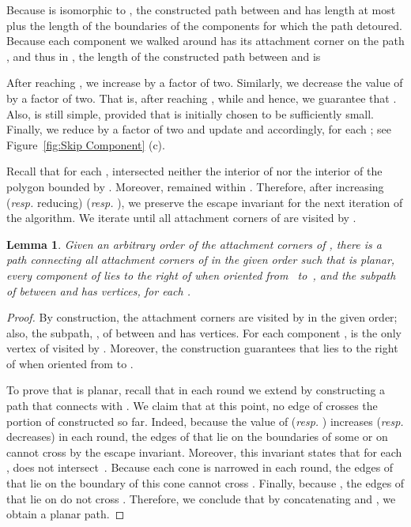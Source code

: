 \documentclass[11pt]{patmorin}
\newtheorem{lemma}[theorem]{Lemma}
\begin{document}
Because  is isomorphic to , the constructed path between  and  has length at most  plus the length of the boundaries of the components for which the path detoured. Because each component we walked around has its attachment corner on the path , and thus in , the length of the constructed path between  and  is


After reaching , we increase  by a factor of two. Similarly, we decrease the value of  by a factor of two. That is, after reaching ,  while  and hence, we guarantee that .
Also,  is still simple, provided that  is initially chosen to be sufficiently small.
Finally, we reduce  by a factor of two and update  and  accordingly, for each ; see Figure~\ref{fig:Skip Component} (c).

Recall that for each ,  intersected neither the interior of  nor the interior of the polygon bounded by . Moreover,  remained within .
Therefore, after increasing (\emph{resp.} reducing)  (\emph{resp.} ), we preserve the escape invariant for the next iteration of the algorithm.
We iterate until all attachment corners of  are visited by .

\begin{lemma}\label{lemma:Path for connected augmentations}
Given an arbitrary order  of the attachment corners of , there is a path  connecting all attachment corners of  in the given order such that  is planar, every component  of  lies to the right of  when oriented from ~to~, and the subpath of  between  and  has  vertices, for each .
\end{lemma}
\begin{proof}
By construction, the attachment corners are visited by  in the given order; also, the subpath, , of  between  and  has  vertices. For each component ,  is the only vertex of  visited by . Moreover, the construction guarantees that  lies to the right of  when oriented from  to .

To prove that  is planar, recall that in each round we extend  by constructing  a path  that connects  with . We claim that at this point, no edge of  crosses the portion of  constructed so far.
Indeed, because the value of  (\emph{resp.} ) increases (\emph{resp.} decreases) in each round, the edges of  that lie on the boundaries of some  or on  cannot cross  by the escape invariant.
Moreover, this invariant states that for each ,  does not intersect~.
Because each cone  is narrowed in each round, the edges of  that lie on the boundary of this cone cannot cross . Finally, because , the edges of  that lie on  do not cross . Therefore, we conclude that by concatenating  and , we obtain a planar path.
\end{proof}
\end{document}
